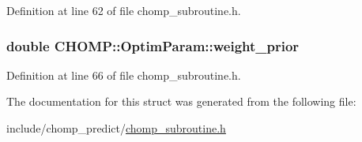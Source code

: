 Definition at line 62 of file chomp\+\_\+subroutine.\+h.

\subsubsection[{\texorpdfstring{weight\+\_\+prior}{weight_prior}}]{\setlength{\rightskip}{0pt plus 5cm}double C\+H\+O\+M\+P\+::\+Optim\+Param\+::weight\+\_\+prior}\hypertarget{struct_c_h_o_m_p_1_1_optim_param_a7dc4e45cd704217867a399e656af6b87}{}\label{struct_c_h_o_m_p_1_1_optim_param_a7dc4e45cd704217867a399e656af6b87}


Definition at line 66 of file chomp\+\_\+subroutine.\+h.



The documentation for this struct was generated from the following file\+:\begin{DoxyCompactItemize}
\item 
include/chomp\+\_\+predict/\hyperlink{chomp__subroutine_8h}{chomp\+\_\+subroutine.\+h}\end{DoxyCompactItemize}
